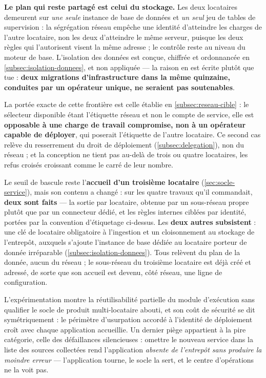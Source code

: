 \textbf{Le plan qui reste partagé est celui du stockage.} Les deux locataires demeurent sur
\emph{une seule} instance de base de données et \emph{un seul} jeu de tables de supervision : la
ségrégation réseau empêche une identité d'atteindre les charges de l'autre locataire, non les deux
d'atteindre le même serveur, puisque les deux règles qui l'autorisent visent la même adresse ; le
contrôle reste au niveau du moteur de base. L'isolation des données est conçue, chiffrée et
ordonnancée en \cref{subsec:isolation-donnees}, et non appliquée --- la raison en est écrite plutôt
que tue : \textbf{deux migrations d'infrastructure dans la même quinzaine, conduites par un
opérateur unique, ne seraient pas soutenables}.

\begin{alertbox}[boxsep=1pt, left=4pt, right=4pt, top=3pt, bottom=3pt]
La portée exacte de cette frontière est celle établie en \cref{subsec:reseau-cible} : le sélecteur
disponible étant l'étiquette réseau et non le compte de service, elle est \textbf{opposable à une
charge de travail compromise, non à un opérateur capable de déployer}, qui poserait l'étiquette de
l'autre locataire. Ce second cas relève du resserrement du droit de déploiement
(\cref{subsec:delegation}), non du réseau ; et la conception ne tient pas au-delà de trois ou
quatre locataires, les refus croisés croissant comme le carré de leur nombre.
\end{alertbox}

Le seuil de bascule reste l'\textbf{accueil d'un troisième locataire} (\cref{sec:socle-service}),
mais son contenu a changé : sur les quatre travaux qu'il commandait, \textbf{deux sont faits} --- la
sortie par locataire, obtenue par un sous-réseau propre plutôt que par un connecteur dédié, et les
règles internes ciblées par identité, portées par la convention d'étiquetage ci-dessus. Les
\textbf{deux autres subsistent} : une clé de locataire obligatoire à l'ingestion et un cloisonnement
au stockage de l'entrepôt, auxquels s'ajoute l'instance de base dédiée au locataire porteur de donnée
irréparable (\cref{subsec:isolation-donnees}). Tous relèvent du plan de la donnée, aucun du réseau ;
le sous-réseau du troisième locataire est déjà créé et adressé, de sorte que son accueil est devenu,
côté réseau, une ligne de configuration.

L'expérimentation montre la réutilisabilité partielle du module d'exécution sans qualifier le socle
de produit multi-locataire abouti, et son coût de sécurité se dit symétriquement : le périmètre
d'usurpation accordé à l'identité de déploiement croît avec chaque application accueillie. Un dernier
piège appartient à la pire catégorie, celle des défaillances silencieuses : omettre le nouveau
service dans la liste des sources collectées rend l'application \emph{absente de l'entrepôt sans
produire la moindre erreur} --- l'application tourne, le socle la sert, et le centre d'opérations ne
la voit pas.

